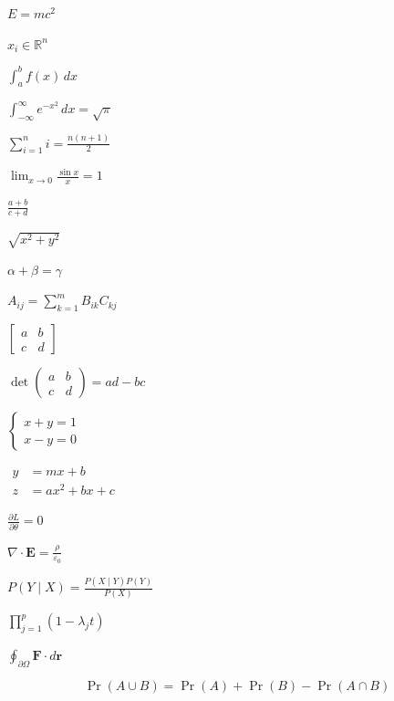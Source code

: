 \documentclass[12pt]{article}
\newcommand{\formpage}[1]{%
  \thispagestyle{empty}\null\vfill
  \begin{center}\ensuremath{\displaystyle #1}\end{center}
  \vfill\null\newpage
}
\begin{document}
\formpage{E=mc^{2}}
\formpage{x_i\in\mathbb{R}^{n}}
\formpage{\int_{a}^{b}f(x)\,dx}
\formpage{\int_{-\infty}^{\infty}e^{-x^{2}}\,dx=\sqrt{\pi}}
\formpage{\sum_{i=1}^{n}i=\frac{n(n+1)}{2}}
\formpage{\lim_{x\to0}\frac{\sin x}{x}=1}
\formpage{\frac{a+b}{c+d}}
\formpage{\sqrt{x^{2}+y^{2}}}
\formpage{\alpha+\beta=\gamma}
\formpage{A_{ij}=\sum_{k=1}^{m}B_{ik}C_{kj}}
\formpage{\begin{bmatrix}a&b\\c&d\end{bmatrix}}
\formpage{\det\begin{pmatrix}a&b\\c&d\end{pmatrix}=ad-bc}
\formpage{\begin{cases}x+y=1\\x-y=0\end{cases}}
\formpage{\begin{aligned}y&=mx+b\\z&=ax^{2}+bx+c\end{aligned}}
\formpage{\frac{\partial L}{\partial\theta}=0}
\formpage{\nabla\cdot\mathbf{E}=\frac{\rho}{\varepsilon_0}}
\formpage{P(Y\mid X)=\frac{P(X\mid Y)P(Y)}{P(X)}}
\formpage{\prod_{j=1}^{p}(1-\lambda_jt)}
\formpage{\oint_{\partial\Omega}\mathbf{F}\cdot d\mathbf{r}}
\thispagestyle{empty}\null\vfill
\begin{equation}\tag{20}
\Pr(A\cup B)=\Pr(A)+\Pr(B)-\Pr(A\cap B)
\end{equation}
\vfill\null
\end{document}
